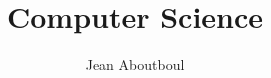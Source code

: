 \documentclass[a4paper, twoside]{report}
\title{Computer Science}
\author{Jean Aboutboul}
\begin{document}

\newpage
\renewcommand{\headrulewidth}{0pt}
\strut
\newpage
\tableofcontents











%
%
\end{document}

